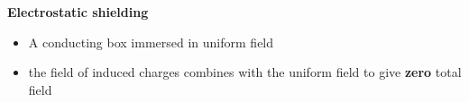 
\textbf{Electrostatic shielding}
\begin{itemize}
	\item A conducting box immersed in uniform field
	\item the field of induced charges combines with the uniform field to give \textbf{zero} total field
\end{itemize}









\newpage


